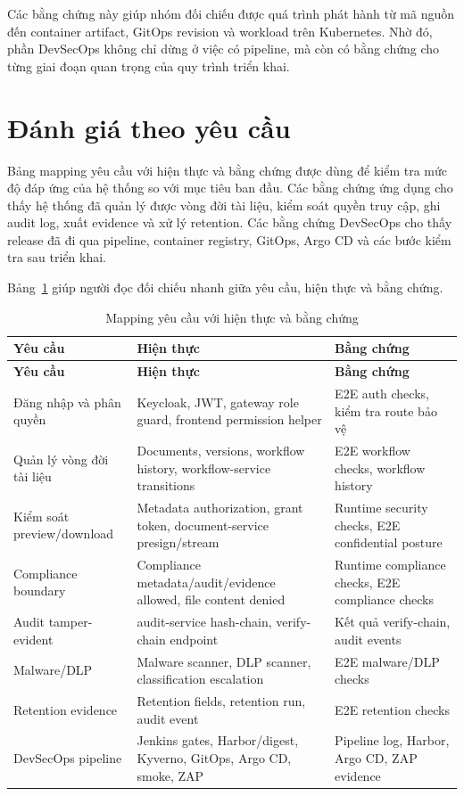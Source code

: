 Các bằng chứng này giúp nhóm đối chiếu được quá trình phát hành từ mã nguồn đến container artifact, GitOps revision và workload trên Kubernetes. Nhờ đó, phần DevSecOps không chỉ dừng ở việc có pipeline, mà còn có bằng chứng cho từng giai đoạn quan trọng của quy trình triển khai.

\section{Đánh giá theo yêu cầu}

Bảng mapping yêu cầu với hiện thực và bằng chứng được dùng để kiểm tra mức độ đáp ứng của hệ thống so với mục tiêu ban đầu. Các bằng chứng ứng dụng cho thấy hệ thống đã quản lý được vòng đời tài liệu, kiểm soát quyền truy cập, ghi audit log, xuất evidence và xử lý retention. Các bằng chứng DevSecOps cho thấy release đã đi qua pipeline, container registry, GitOps, Argo CD và các bước kiểm tra sau triển khai.

Bảng~\ref{tab:req-impl-evidence} giúp người đọc đối chiếu nhanh giữa yêu cầu, hiện thực và bằng chứng.

\begin{longtable}{p{}p{}p{}}
\caption{Mapping yêu cầu với hiện thực và bằng chứng}
\label{tab:req-impl-evidence} \\
\toprule
\textbf{Yêu cầu} & \textbf{Hiện thực} & \textbf{Bằng chứng} \\
\midrule
\endfirsthead
\toprule
\textbf{Yêu cầu} & \textbf{Hiện thực} & \textbf{Bằng chứng} \\
\midrule
\endhead
Đăng nhập và phân quyền & Keycloak, JWT, gateway role guard, frontend permission helper & E2E auth checks, kiểm tra route bảo vệ \\
Quản lý vòng đời tài liệu & Documents, versions, workflow history, workflow-service transitions & E2E workflow checks, workflow history \\
Kiểm soát preview/download & Metadata authorization, grant token, document-service presign/stream & Runtime security checks, E2E confidential posture \\
Compliance boundary & Compliance metadata/audit/evidence allowed, file content denied & Runtime compliance checks, E2E compliance checks \\
Audit tamper-evident & audit-service hash-chain, verify-chain endpoint & Kết quả verify-chain, audit events \\
Malware/DLP & Malware scanner, DLP scanner, classification escalation & E2E malware/DLP checks \\
Retention evidence & Retention fields, retention run, audit event & E2E retention checks \\
DevSecOps pipeline & Jenkins gates, Harbor/digest, Kyverno, GitOps, Argo CD, smoke, ZAP & Pipeline log, Harbor, Argo CD, ZAP evidence \\
\bottomrule
\end{longtable}

